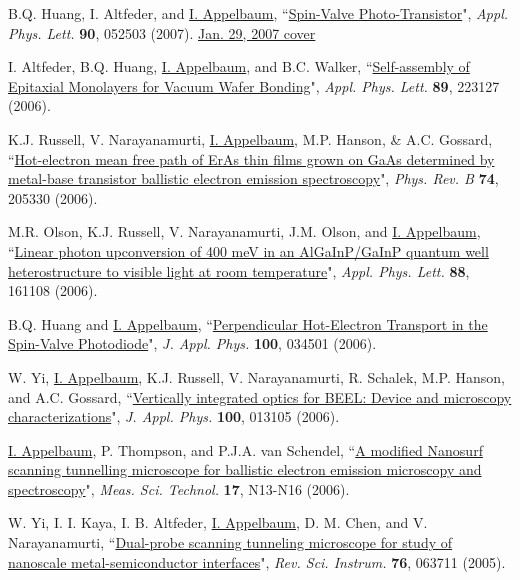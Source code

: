 \documentclass[paper=letter,fontsize=11pt]{scrartcl} %
\newcommand{\PaperEntry}[7]{
		\noindent #1, ``\href{#7}{#2}", \textit{#3} \textbf{#4}, #5 (#6).}
\begin{document}
\begin{etaremune}
\item\PaperEntry{B.Q. Huang, I. Altfeder, and \underline{I. Appelbaum}}{Spin-Valve Photo-Transistor}{Appl. Phys. Lett.}{90}{052503}{2007}{http://dx.doi.org/10.1063/1.2436715} \href{http://scitation.aip.org/apl/covers/90_5.jsp}{Jan. 29, 2007 cover} 

\item\PaperEntry{I. Altfeder, B.Q. Huang, \underline{I. Appelbaum}, and B.C. Walker}{Self-assembly of Epitaxial Monolayers for Vacuum Wafer Bonding}{Appl. Phys. Lett.}{89}{223127}{2006}{http://dx.doi.org/10.1063/1.2399358}

\item\PaperEntry{K.J. Russell, V. Narayanamurti, \underline{I. Appelbaum}, M.P. Hanson, \& A.C. Gossard}{Hot-electron mean free path of ErAs thin films grown on GaAs determined by metal-base transistor ballistic electron emission spectroscopy}{Phys. Rev. B}{74}{205330}{2006}{http://dx.doi.org/10.1103/PhysRevB.74.205330}

\item\PaperEntry{M.R. Olson, K.J. Russell, V. Narayanamurti, J.M. Olson, and \underline{I. Appelbaum}}{Linear photon upconversion of 400 meV in an AlGaInP/GaInP quantum well heterostructure to visible light at room temperature}{Appl. Phys. Lett.}{88}{161108}{2006}{http://dx.doi.org/10.1063/1.2195094}

\item\PaperEntry{B.Q. Huang and \underline{I. Appelbaum}}{Perpendicular Hot-Electron Transport in the Spin-Valve Photodiode}{J. Appl. Phys.}{100}{034501}{2006}{http://dx.doi.org/10.1063/1.2220643}

\item\PaperEntry{W. Yi, \underline{I. Appelbaum}, K.J. Russell, V. Narayanamurti, R. Schalek, M.P. Hanson, and A.C. Gossard}{Vertically integrated optics for BEEL: Device and microscopy characterizations}{J. Appl. Phys.}{100}{013105}{2006}{http://dx.doi.org/10.1063/1.2208738}

\item\PaperEntry{\underline{I. Appelbaum}, P. Thompson, and P.J.A. van Schendel}{A modified Nanosurf scanning tunnelling microscope for ballistic electron emission microscopy and spectroscopy}{Meas. Sci. Technol.}{17}{N13-N16}{2006}{http://dx.doi.org/10.1088/0957-0233/17/4/N02}

\item\PaperEntry{W. Yi, I. I. Kaya, I. B. Altfeder, \underline{I. Appelbaum}, D. M. Chen, and V. Narayanamurti}{Dual-probe scanning tunneling microscope for study of nanoscale metal-semiconductor interfaces}{Rev. Sci. Instrum.}{76}{063711}{2005}{http://dx.doi.org/10.1063/1.1938969}


\end{etaremune}
\end{document}
